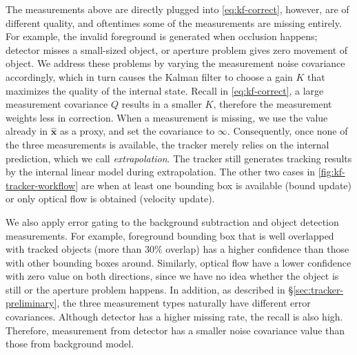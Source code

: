 The measurements above are directly plugged into \ref{eq:kf-correct}, however, are of different quality, and oftentimes some of the measurements are missing entirely. For example, the invalid foreground is generated when occlusion happens; detector misses a small-sized object, or aperture problem gives zero movement of object.
We address these problems by varying the measurement noise covariance accordingly, which in turn causes the Kalman filter to choose a gain $K$ that maximizes the quality of the internal state. Recall in \ref{eq:kf-correct}, a large measurement covariance $Q$ results in a smaller $K$, therefore the measurement weights less in correction. When a measurement is missing, we use the value already in $\mathbf{\hat x}$ as a proxy, and set the covariance to $\infty$. Consequently, once none of the three measurements is available, the tracker merely relies on the internal prediction, which we call \emph{extrapolation}. The tracker still generates tracking results by the internal linear model during extrapolation. The other two cases in \ref{fig:kf-tracker-workflow} are when at least one bounding box is available (bound update) or only optical flow is obtained (velocity update).

We also apply error gating to the background subtraction and object detection measurements. %
For example, foreground bounding box that is well overlapped with tracked objects (more than $30\%$ overlap) has a higher confidence than those with other bounding boxes around. Similarly, optical flow have a lower confidence with zero value on both directions, since we have no idea whether the object is still or the aperture problem happens.
In addition, as described in \S\ref{sec:tracker-preliminary}, the three measurement types naturally have different error covariances. Although detector has a higher missing rate, the recall is also high. Therefore, measurement from detector has a smaller noise covariance value than those from background model.

